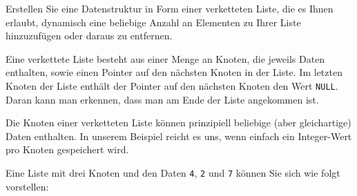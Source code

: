 \vspace{10pt}

Erstellen Sie eine Datenstruktur in Form einer verketteten Liste, die es Ihnen
erlaubt, dynamisch eine beliebige Anzahl an Elementen zu Ihrer Liste
hinzuzufügen oder daraus zu entfernen.

Eine verkettete Liste besteht aus einer Menge an Knoten, die jeweils Daten
enthalten, sowie einen Pointer auf den nächsten Knoten in der Liste. Im letzten
Knoten der Liste enthält der Pointer auf den nächsten Knoten den Wert
\texttt{NULL}. Daran kann man erkennen, dass man am Ende der Liste
angekommen ist.

Die Knoten einer verketteten Liste können prinzipiell beliebige (aber
gleichartige) Daten enthalten. In unserem Beispiel reicht es uns, wenn einfach
ein Integer-Wert pro Knoten gespeichert wird.

Eine Liste mit drei Knoten und den Daten \texttt{4}, \texttt{2}
und \texttt{7} können Sie sich wie folgt vorstellen:

